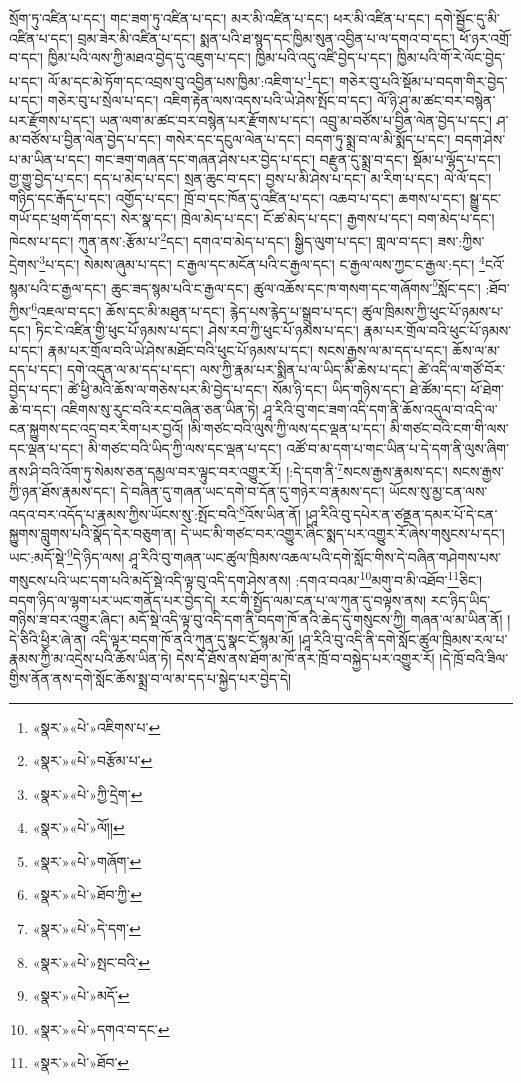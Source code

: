སྲོག་ཏུ་འཛིན་པ་དང་། གང་ཟག་ཏུ་འཛིན་པ་དང་། མར་མི་འཛིན་པ་དང་། ཕར་མི་འཛིན་པ་དང་། དགེ་སྦྱོང་དུ་མི་འཛིན་པ་དང་། བྲམ་ཟེར་མི་འཛིན་པ་དང་། སྨན་པའི་ཐ་སྙད་དང་ཁྱིམ་སུན་འབྱིན་པ་ལ་དགའ་བ་དང་། ཕོ་ཉར་འགྲོ་བ་དང་། ཁྱིམ་པའི་ལས་ཀྱི་མཐའ་བྱེད་དུ་འཇུག་པ་དང་། ཁྱིམ་པའི་འདུ་འཛི་བྱེད་པ་དང་། ཁྱིམ་པའི་གོ་རེ་ལོང་བྱེད་པ་དང་། ལོ་མ་དང་མེ་ཏོག་དང་འབྲས་བུ་འབྱིན་པས་ཁྱིམ་:འཇིག་པ་\footnote{«སྣར་»«པེ་»འཇིགས་པ་}དང་། གཅེར་བུ་པའི་སྡོམ་པ་བདག་གིར་བྱེད་པ་དང་། གཅེར་བུ་པ་སྲེལ་པ་དང་། འཇིག་རྟེན་ལས་འདས་པའི་ཡེ་ཤེས་སྤོང་བ་དང་། ལོ་ཉི་ཤུ་མ་ཚང་བར་བསྙེན་པར་རྫོགས་པ་དང་། ཡན་ལག་མ་ཚང་བར་བསྙེན་པར་རྫོགས་པ་དང་། འབྲུ་མ་བཙོས་པ་བྱིན་ལེན་བྱེད་པ་དང་། ཤ་མ་བཙོས་པ་བྱིན་ལེན་བྱེད་པ་དང་། གསེར་དང་དངུལ་ལེན་པ་དང་། བདག་ཏུ་སྨྲ་བ་ལ་མི་སྨོད་པ་དང་། བདག་ཤེས་པ་མ་ཡིན་པ་དང་། གང་ཟག་གཞན་དང་གཞན་ཤེས་པར་བྱེད་པ་དང་། བརྫུན་དུ་སྨྲ་བ་དང་། སྡོམ་པ་ལྷོད་པ་དང་། གྱ་གྱུ་བྱེད་པ་དང་། དད་པ་མེད་པ་དང་། སྲན་ཆུང་བ་དང་། བྱས་པ་མི་ཤེས་པ་དང་། མ་རིག་པ་དང་། ལེ་ལོ་དང་། གཉིད་དང་རྒོད་པ་དང་། འགྱོད་པ་དང་། ཁྲོ་བ་དང་ཁོན་དུ་འཛིན་པ་དང་། འཆབ་པ་དང་། ཆགས་པ་དང་། སྒྱུ་དང་གཡོ་དང་ཕྲག་དོག་དང་། སེར་སྣ་དང་། ཁྲེལ་མེད་པ་དང་། ངོ་ཚ་མེད་པ་དང་། རྒྱགས་པ་དང་། བག་མེད་པ་དང་། ཁེངས་པ་དང་། ཀུན་ནས་:རྩོམ་པ་\footnote{«སྣར་»«པེ་»བརྩོམ་པ་}དང་། དགའ་བ་མེད་པ་དང་། སྒྱིད་ལུག་པ་དང་། གླལ་བ་དང་། ཟས་:ཀྱིས་དྲེགས་\footnote{«སྣར་»«པེ་»ཀྱི་དྲེག་}པ་དང་། སེམས་ཞུམ་པ་དང་། ང་རྒྱལ་དང་མངོན་པའི་ང་རྒྱལ་དང་། ང་རྒྱལ་ལས་ཀྱང་ང་རྒྱལ་:དང་། \footnote{«སྣར་»«པེ་»ལོ།། }ངའོ་སྙམ་པའི་ང་རྒྱལ་དང་། ཆུང་ཟད་སྙམ་པའི་ང་རྒྱལ་དང་། ཚུལ་འཆོས་དང་ཁ་གསག་དང་གཞོགས་\footnote{«སྣར་»«པེ་»གཞོག་}སློང་དང་། :ཐོབ་ཀྱིས་\footnote{«སྣར་»«པེ་»ཐོབ་ཀྱི་}འཇལ་བ་དང་། ཆོས་དང་མི་མཐུན་པ་དང་། རྙེད་པས་རྙེད་པ་སྒྲུབ་པ་དང་། ཚུལ་ཁྲིམས་ཀྱི་ཕུང་པོ་ཉམས་པ་དང་། ཏིང་ངེ་འཛིན་གྱི་ཕུང་པོ་ཉམས་པ་དང་། ཤེས་རབ་ཀྱི་ཕུང་པོ་ཉམས་པ་དང་། རྣམ་པར་གྲོལ་བའི་ཕུང་པོ་ཉམས་པ་དང་། རྣམ་པར་གྲོལ་བའི་ཡེ་ཤེས་མཐོང་བའི་ཕུང་པོ་ཉམས་པ་དང་། སངས་རྒྱས་ལ་མ་དད་པ་དང་། ཆོས་ལ་མ་དད་པ་དང་། དགེ་འདུན་ལ་མ་དད་པ་དང་། ལས་ཀྱི་རྣམ་པར་སྨིན་པ་ལ་ཡིད་མི་ཆེས་པ་དང་། ཚེ་འདི་ལ་གཙོ་བོར་བྱེད་པ་དང་། ཚེ་ཕྱི་མའི་ཆོས་ལ་གཅེས་པར་མི་བྱེད་པ་དང་། སོམ་ཉི་དང་། ཡིད་གཉིས་དང་། ཐེ་ཚོམ་དང་། ཕོ་ཐེག་ཆེ་བ་དང་། འཇིགས་སུ་རུང་བའི་རང་བཞིན་ཅན་ཡིན་ཏེ། ཤཱ་རིའི་བུ་གང་ཟག་འདི་དག་ནི་ཆོས་འདུལ་བ་འདི་ལ་ངན་སྐྱུགས་དང་འདྲ་བར་རིག་པར་བྱའོ། །མི་གཙང་བའི་ལུས་ཀྱི་ལས་དང་ལྡན་པ་དང་། མི་གཙང་བའི་ངག་གི་ལས་དང་ལྡན་པ་དང་། མི་གཙང་བའི་ཡིད་ཀྱི་ལས་དང་ལྡན་པ་དང་། འཚོ་བ་མ་དག་པ་གང་ཡིན་པ་དེ་དག་ནི་ལུས་ཞིག་ནས་ཤི་བའི་འོག་ཏུ་སེམས་ཅན་དམྱལ་བར་ལྟུང་བར་འགྱུར་རོ། །:དེ་དག་ནི་\footnote{«སྣར་»«པེ་»དེ་དག་}སངས་རྒྱས་རྣམས་དང་། སངས་རྒྱས་ཀྱི་ཉན་ཐོས་རྣམས་དང་། དེ་བཞིན་དུ་གཞན་ཡང་དགེ་བ་དོན་དུ་གཉེར་བ་རྣམས་དང་། ཡོངས་སུ་མྱ་ངན་ལས་འདའ་བར་འདོད་པ་རྣམས་ཀྱིས་ཡོངས་སུ་:སྤོང་བའི་\footnote{«སྣར་»«པེ་»སྤང་བའི་}འོས་ཡིན་ནོ། །ཤཱ་རིའི་བུ་དཔེར་ན་ཙནྡན་དམར་པོ་དེ་ངན་སྐྱུགས་བླུགས་པའི་སྣོད་དེར་བཅུག་ན། དེ་ཡང་མི་གཙང་བར་འགྱུར་ཞིང་སྨད་པར་འགྱུར་རོ་ཞེས་གསུངས་པ་དང་། ཡང་:མདོ་སྡེ་\footnote{«སྣར་»«པེ་»མདོ་}དེ་ཉིད་ལས། ཤཱ་རིའི་བུ་གཞན་ཡང་ཚུལ་ཁྲིམས་འཆལ་པའི་དགེ་སློང་གིས་དེ་བཞིན་གཤེགས་པས་གསུངས་པའི་ཡང་དག་པའི་མདོ་སྡེ་འདི་ལྟ་བུ་འདི་དག་ཤེས་ནས། :དགའ་བའམ་\footnote{«སྣར་»«པེ་»དགའ་བ་དང་}མགུ་བ་མི་འཐོབ་\footnote{«སྣར་»«པེ་»ཐོབ་}ཅིང་། བདག་ཉིད་ལ་ལྷག་པར་ཡང་གནོད་པར་བྱེད་དེ། རང་གི་སྤྱོད་ལམ་ངན་པ་ལ་ཀུན་དུ་བལྟས་ནས། རང་ཉིད་ཡིད་གཉིས་ཟ་བར་འགྱུར་ཞིང་། མདོ་སྡེ་འདི་ལྟ་བུ་འདི་དག་ནི་བདག་ཁོ་ནའི་ཆེད་དུ་གསུངས་ཀྱི། གཞན་ལ་མ་ཡིན་ནོ། །དེ་ཅིའི་ཕྱིར་ཞེ་ན། འདི་ལྟར་བདག་ཁོ་ནའི་ཀུན་དུ་སྣང་ངོ་སྙམ་མོ། །ཤཱ་རིའི་བུ་འདི་ནི་དགེ་སློང་ཚུལ་ཁྲིམས་རལ་པ་རྣམས་ཀྱི་མ་འདྲེས་པའི་ཆོས་ཡིན་ཏེ། དེས་དེ་ཐོས་ནས་ཐོག་མ་ཁོ་ནར་ཁྲོ་བ་བསྐྱེད་པར་འགྱུར་རོ། །དེ་ཁྲོ་བའི་ཟིལ་གྱིས་ནོན་ནས་དགེ་སློང་ཆོས་སྨྲ་བ་ལ་མ་དད་པ་སྐྱེད་པར་བྱེད་དེ། 